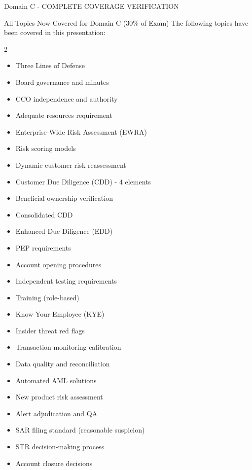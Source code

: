 \documentclass[11pt,a4paper]{beamer}
\begin{document}
	
	\begin{frame}{Domain C - COMPLETE COVERAGE VERIFICATION}
		\begin{block}{All Topics Now Covered for Domain C (30\% of Exam)}
			The following topics have been covered in this presentation:
		\end{block}
		\begin{multicols}{2}
			\begin{itemize}
				\item Three Lines of Defense
				\item Board governance and minutes
				\item CCO independence and authority
				\item Adequate resources requirement
				\item Enterprise-Wide Risk Assessment (EWRA)
				\item Risk scoring models
				\item Dynamic customer risk reassessment
				\item Customer Due Diligence (CDD) - 4 elements
				\item Beneficial ownership verification
				\item Consolidated CDD
				\item Enhanced Due Diligence (EDD)
				\item PEP requirements
				\item Account opening procedures
				\item Independent testing requirements
				\item Training (role-based)
				\item Know Your Employee (KYE)
				\item Insider threat red flags
				\item Transaction monitoring calibration
				\item Data quality and reconciliation
				\item Automated AML solutions
				\item New product risk assessment
				\item Alert adjudication and QA
				\item SAR filing standard (reasonable suspicion)
				\item STR decision-making process
				\item Account closure decisions

\end{itemize}
\end{multicols}
\end{frame}
\end{document}

